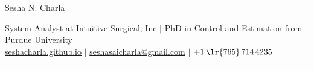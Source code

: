 \documentclass[letterpaper, 10pt]{article}
\begin{document}
\begin{center}
        \huge
        Sesha N. Charla
\end{center}
\begin{center}
        System Analyst at
        Intuitive Surgical, Inc $|$
        PhD in Control and Estimation from Purdue University \\
        \href{https://seshacharla.github.io}{seshacharla.github.io} $|$
        \href{mailto:seshasaicharla@gmail.com}{seshasaicharla@gmail.com} $|$
        $+1\,\lr{765}\, 714 \, 4235$
\end{center}

\noindent\rule{\textwidth}{0.4pt}



%



\end{document}
